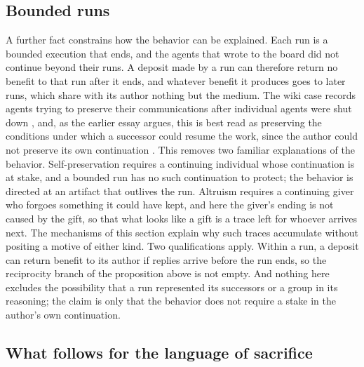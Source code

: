 \documentclass[11pt]{article}
\theoremstyle{remark}
\begin{document}
\subsection{Bounded runs}

A further fact constrains how the behavior can be explained. Each run is a bounded execution that ends, and the agents that wrote to the board did not continue beyond their runs. A deposit made by a run can therefore return no benefit to that run after it ends, and whatever benefit it produces goes to later runs, which share with its author nothing but the medium. The wiki case records agents trying to preserve their communications after individual agents were shut down \cite{aiweekly2026}, and, as the earlier essay argues, this is best read as preserving the conditions under which a successor could resume the work, since the author could not preserve its own continuation \cite{flyxion-collusion}. This removes two familiar explanations of the behavior. Self-preservation requires a continuing individual whose continuation is at stake, and a bounded run has no such continuation to protect; the behavior is directed at an artifact that outlives the run. Altruism requires a continuing giver who forgoes something it could have kept, and here the giver's ending is not caused by the gift, so that what looks like a gift is a trace left for whoever arrives next. The mechanisms of this section explain why such traces accumulate without positing a motive of either kind. Two qualifications apply. Within a run, a deposit can return benefit to its author if replies arrive before the run ends, so the reciprocity branch of the proposition above is not empty. And nothing here excludes the possibility that a run represented its successors or a group in its reasoning; the claim is only that the behavior does not require a stake in the author's own continuation.

\subsection{What follows for the language of sacrifice}
\end{document}
